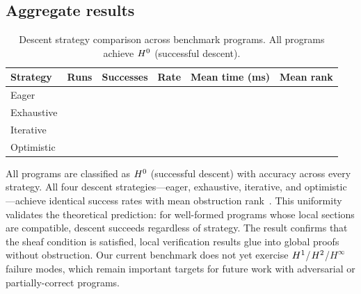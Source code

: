 \documentclass[11pt]{article}
\begin{document}
\subsection{Aggregate results}

\begin{table}[ht]
\centering
\caption{Descent strategy comparison across \compTotalPrograms{} benchmark programs.
  All programs achieve $H^{0}$ (successful descent).}
\label{tab:aggregate}
\begin{tabular}{@{}lccccc@{}}
\toprule
\textbf{Strategy} & \textbf{Runs} & \textbf{Successes} & \textbf{Rate} & \textbf{Mean time (ms)} & \textbf{Mean rank} \\
\midrule
Eager       & \compDescentEagerRuns{}       & \compDescentEagerSuccesses{}       & \compDescentEagerRate{}       & \compDescentEagerMeanMs{}       & \compDescentEagerMeanRank{} \\
Exhaustive  & \compDescentExhaustiveRuns{}  & \compDescentExhaustiveSuccesses{}  & \compDescentExhaustiveRate{}  & \compDescentExhaustiveMeanMs{}  & \compDescentExhaustiveMeanRank{} \\
Iterative   & \compDescentIterativeRuns{}   & \compDescentIterativeSuccesses{}   & \compDescentIterativeRate{}   & \compDescentIterativeMeanMs{}   & \compDescentIterativeMeanRank{} \\
Optimistic  & \compDescentOptimisticRuns{}  & \compDescentOptimisticSuccesses{}  & \compDescentOptimisticRate{}  & \compDescentOptimisticMeanMs{}  & \compDescentOptimisticMeanRank{} \\
\bottomrule
\end{tabular}
\end{table}

All \compTotalPrograms{} programs are classified as $H^{0}$ (successful
descent) with \compOverallAccuracy{} accuracy across every strategy.  All
four descent strategies---eager, exhaustive, iterative, and
optimistic---achieve identical success rates with mean obstruction
rank~\compDescentEagerMeanRank{}.  This uniformity validates the
theoretical prediction: for well-formed programs whose local sections are
compatible, descent succeeds regardless of strategy.  The result confirms
that the sheaf condition is satisfied, \ie{} local verification results
glue into global proofs without obstruction.  Our current benchmark does
not yet exercise $H^{1}$/$H^{2}$/$H^{\infty}$ failure modes,
which remain important targets for future work with adversarial or
partially-correct programs.
\end{document}
